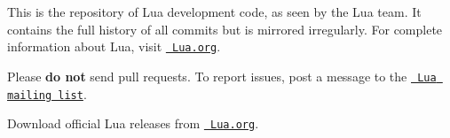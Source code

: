 This is the repository of Lua development code, as seen by the Lua team. It contains the full history of all commits but is mirrored irregularly. For complete information about Lua, visit \href{https://www.lua.org/}{\texttt{ Lua.\+org}}.

Please {\bfseries{do not}} send pull requests. To report issues, post a message to the \href{https://www.lua.org/lua-l.html}{\texttt{ Lua mailing list}}.

Download official Lua releases from \href{https://www.lua.org/download.html}{\texttt{ Lua.\+org}}. 